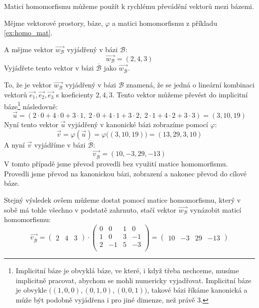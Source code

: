 Matici homomorfismu můžeme použít k rychlému převádění vektorů mezi bázemi.
\begin{example}
    Mějme vektorové prostory, báze, $\varphi$ a matici homomorfismu
    z příkladu \ref{ex:homo_mat}.

    A mějme vektor $\vec{w_{\mathcal{B}}}$ vyjádřený v bázi $\mathcal{B}$:
    $$\vec{w_{\mathcal{B}}} = (2, 4, 3)$$
    Vyjádřete tento vektor v bázi $\overline{\mathcal{B}}$ jako
    $\vec{w_{\overline{\mathcal{B}}}}$.

    To, že je vektor $\vec{w_{\mathcal{B}}}$ vyjádřený v bázi $\mathcal{B}$ znamená,
    že se jedná o lineární kombinaci vektorů $\vec{e_1}, \vec{e_2}, \vec{e_3}$ s koeficienty
    $2, 4, 3$.
    Tento vektor můžeme převést do implicitní báze\footnote{Implicitní báze je obvyklá báze, ve
    které, i když třeba nechceme, musíme implicitně pracovat, abychom se mohli
    numericky vyjadřovat. Implicitní báze je obvykle
    $\big((1, 0, 0), (0, 1, 0), (0, 0, 1) \big)$, takové bázi říkáme kanonická a může být
    podobně vyjádřena i pro jiné dimenze, než právě 3.} následovně:
    $$\vec{u} = (2\cdot 0 + 4\cdot 0 + 3\cdot 1,\; 2\cdot 0 + 4\cdot 1 + 3\cdot 2,\;
    2\cdot 1 + 4\cdot 2 + 3\cdot 3) = (3, 10, 19)$$
    Nyní tento vektor $\vec{u}$ vyjádřený v kanonické bázi zobrazíme pomocí $\varphi$:
    $$\vec{v} = \varphi(\vec{u}) = \varphi\big( (3, 10, 19) \big) = (13, 29, 3, 10)$$
    A nyní $\vec{v}$ vyjádříme v bázi $\overline{\mathcal{B}}$:
    $$\vec{v_{\overline{\mathcal{B}}}} = (10, -3, 29, -13)$$
    V tomto případě jsme převod provedli bez využití matice homomorfismu. Provedli jsme převod
    na kanonickou bázi, zobrazení a nakonec převod do cílové báze.

    Stejný výsledek ovšem můžeme dostat pomocí matice homomorfismu, který v sobě má tohle
    všechno v podstatě zahrnuto, stačí vektor $\vec{w_{\mathcal{B}}}$ vynázobit maticí homomorfismu:
    \[
        \vec{v_{\overline{\mathcal{B}}}} =
        \begin{pmatrix}
            2 & 4 & 3
        \end{pmatrix} \cdot
        \begin{pmatrix}
            0 & 0 & 1 & 0\\
            1 & 0 & 3 & -1\\
            2 & -1 & 5 & -3\\
        \end{pmatrix} =
        \begin{pmatrix}
            10 & -3 & 29 & -13
        \end{pmatrix}
    \]
\end{example}

